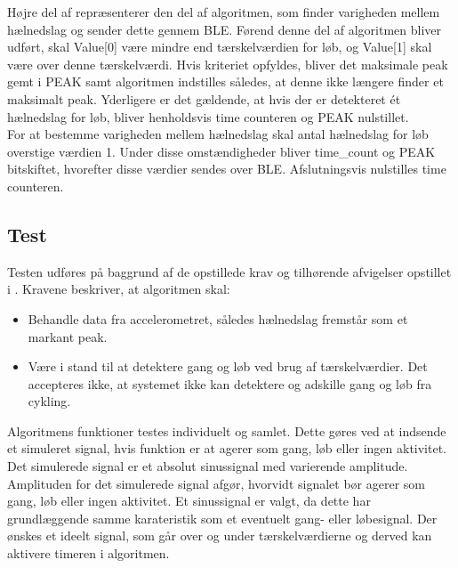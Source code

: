 Højre del af  repræsenterer den del af algoritmen, som finder varigheden mellem hælnedslag og sender dette gennem BLE. Førend denne del af algoritmen bliver udført, skal Value[0] være mindre end tærskelværdien for løb, og Value[1] skal være over denne tærskelværdi. Hvis kriteriet opfyldes, bliver det maksimale peak gemt i PEAK samt algoritmen indstilles således, at denne ikke længere finder et maksimalt peak. Yderligere er det gældende, at hvis der er detekteret ét hælnedslag for løb, bliver henholdsvis time counteren og PEAK nulstillet. \\
For at bestemme varigheden mellem hælnedslag  skal antal hælnedslag for løb overstige værdien 1. Under disse omstændigheder bliver time\_count og PEAK bitskiftet, hvorefter disse værdier sendes over BLE. Afslutningsvis nulstilles time counteren.

\subsection{Test}
Testen udføres på baggrund af de opstillede krav og tilhørende afvigelser opstillet i . Kravene beskriver, at algoritmen skal:
\begin{itemize}
	\item Behandle data fra accelerometret, således hælnedslag fremstår som et markant peak.
	\item Være i stand til at detektere gang og løb ved brug af tærskelværdier. Det accepteres ikke, at systemet ikke kan detektere og adskille gang og løb fra cykling.
\end{itemize}
Algoritmens funktioner testes individuelt og samlet. Dette gøres ved at indsende et simuleret signal, hvis funktion er at agerer som gang, løb eller ingen aktivitet. Det simulerede signal er et absolut sinussignal med varierende amplitude. Amplituden for det simulerede signal afgør, hvorvidt signalet bør agerer som gang, løb eller ingen aktivitet. Et sinussignal er valgt, da dette har grundlæggende samme karateristik som et eventuelt gang- eller løbesignal. Der ønskes et ideelt signal, som går over og under tærskelværdierne og derved kan aktivere timeren i algoritmen.


